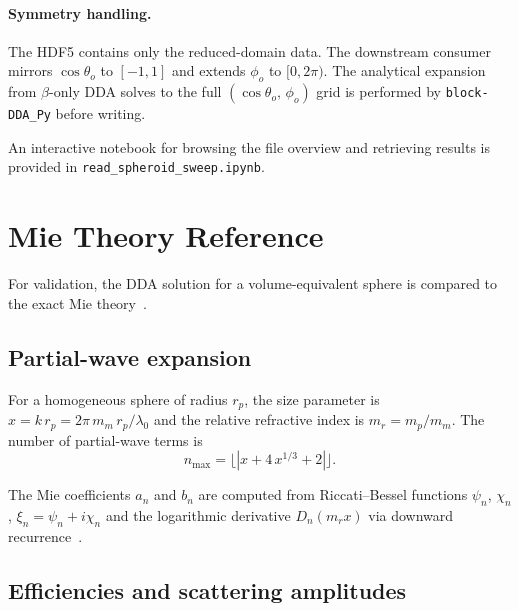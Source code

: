 \documentclass[11pt,a4paper]{article}
\begin{document}
\paragraph{Symmetry handling.}
The HDF5 contains only the reduced-domain data.  The downstream
consumer mirrors $\cos\theta_o$ to $[-1, 1]$ and extends $\phi_o$ to
$[0, 2\pi)$.  The analytical expansion from $\beta$-only DDA solves
to the full $(\cos\theta_o,\, \phi_o)$ grid is performed by
\texttt{block-DDA\_Py} before writing.

An interactive notebook for browsing the file overview and retrieving
results is provided in \texttt{read\_spheroid\_sweep.ipynb}.

\section{Mie Theory Reference}
\label{sec:mie}

For validation, the DDA solution for a volume-equivalent sphere is
compared to the exact Mie theory~\cite{Bohren1983}.

\subsection{Partial-wave expansion}
\label{sec:mie-expansion}

For a homogeneous sphere of radius $r_p$, the size parameter is
$x = k\,r_p = 2\pi\,m_m\,r_p / \lambda_0$ and the relative refractive
index is $m_r = m_p / m_m$.
The number of partial-wave terms is
\begin{equation}
  n_{\max} = \lfloor |x + 4\,x^{1/3} + 2| \rfloor.
  \label{eq:nstop}
\end{equation}

The Mie coefficients $a_n$ and $b_n$ are computed from
Riccati--Bessel functions $\psi_n$, $\chi_n$, $\xi_n = \psi_n + i\chi_n$
and the logarithmic derivative $D_n(m_r x)$ via downward
recurrence~\cite{Bohren1983}.

\subsection{Efficiencies and scattering amplitudes}
\label{sec:mie-efficiencies}
\end{document}

